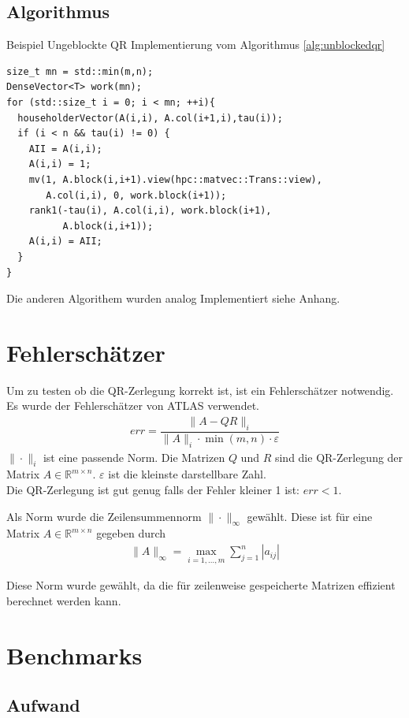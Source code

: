 \subsection{Algorithmus}

Beispiel Ungeblockte QR Implementierung vom Algorithmus \ref{alg:unblockedqr}
\lstset{numbers=left}
\begin{lstlisting}
size_t mn = std::min(m,n);
DenseVector<T> work(mn);
for (std::size_t i = 0; i < mn; ++i){
  householderVector(A(i,i), A.col(i+1,i),tau(i));
  if (i < n && tau(i) != 0) {
    AII = A(i,i);
    A(i,i) = 1;
    mv(1, A.block(i,i+1).view(hpc::matvec::Trans::view),
       A.col(i,i), 0, work.block(i+1));
    rank1(-tau(i), A.col(i,i), work.block(i+1), 
          A.block(i,i+1));
    A(i,i) = AII;
  }
}
\end{lstlisting}

Die anderen Algorithem wurden analog Implementiert siehe Anhang.

\section{Fehlerschätzer}

Um zu testen ob die QR-Zerlegung korrekt ist, ist ein Fehlerschätzer notwendig.
Es wurde der Fehlerschätzer von ATLAS\cite{atlas} verwendet.
\begin{align}
err = \dfrac{\|A - QR\|_i}{\|A\|_i \cdot \min(m,n) \cdot \varepsilon}
\end{align}
$\|\cdot\|_i$ ist eine passende Norm.
Die Matrizen $Q$ und $R$ sind die QR-Zerlegung der Matrix $A \in \mathbb{R}^{m \times n}$.
$\varepsilon$ ist die kleinste darstellbare Zahl.\\
Die QR-Zerlegung ist gut genug falls der Fehler kleiner 1 ist: $ err < 1 $.

Als Norm wurde die Zeilensummennorm $\|\cdot\|_\infty$ gewählt.
Diese ist für eine Matrix $A \in \mathbb{R}^{m\times n}$ gegeben durch
\begin{align*}
\|A\|_\infty = \max_{i=1,...,m} \sum_{j=1}^{n} |a_{ij}|
\end{align*}

Diese Norm wurde gewählt, da die für zeilenweise gespeicherte Matrizen effizient berechnet werden kann.

\section{Benchmarks}

\subsection{Aufwand}

